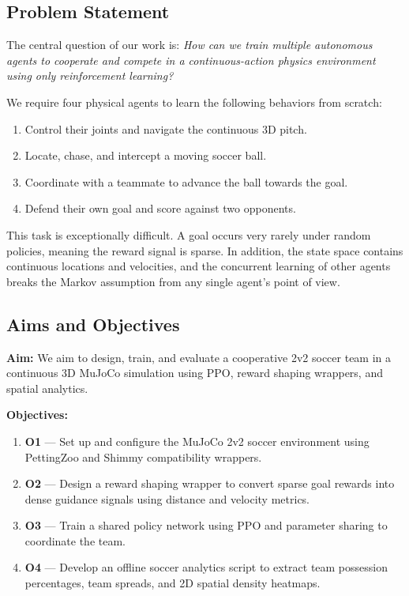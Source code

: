 \subsection{Problem Statement}
\label{sec:intro_prob_art}

The central question of our work is: \textit{How can we train multiple autonomous agents to cooperate and compete in a continuous-action physics environment using only reinforcement learning?}

We require four physical agents to learn the following behaviors from scratch:
\begin{enumerate}
    \item Control their joints and navigate the continuous 3D pitch.
    \item Locate, chase, and intercept a moving soccer ball.
    \item Coordinate with a teammate to advance the ball towards the goal.
    \item Defend their own goal and score against two opponents.
\end{enumerate}

This task is exceptionally difficult. A goal occurs very rarely under random policies, meaning the reward signal is sparse. In addition, the state space contains continuous locations and velocities, and the concurrent learning of other agents breaks the Markov assumption from any single agent's point of view.

\subsection{Aims and Objectives}
\label{sec:intro_aims_obj}

\textbf{Aim:} We aim to design, train, and evaluate a cooperative 2v2 soccer team in a continuous 3D MuJoCo simulation using PPO, reward shaping wrappers, and spatial analytics.

\textbf{Objectives:}
\begin{enumerate}
    \item \textbf{O1} — Set up and configure the MuJoCo 2v2 soccer environment using PettingZoo and Shimmy compatibility wrappers.
    \item \textbf{O2} — Design a reward shaping wrapper to convert sparse goal rewards into dense guidance signals using distance and velocity metrics.
    \item \textbf{O3} — Train a shared policy network using PPO and parameter sharing to coordinate the team.
    \item \textbf{O4} — Develop an offline soccer analytics script to extract team possession percentages, team spreads, and 2D spatial density heatmaps.
\end{enumerate}

